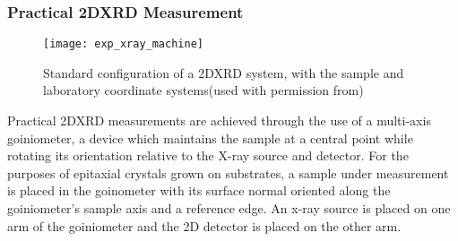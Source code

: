 \subsubsection{Practical 2DXRD Measurement}
\begin{figure}
    \centering
    \texttt{[image: exp\_xray\_machine]}
    \caption[Typical 2DXRD experimental implementation]{\label{fig:exp_xray_machine}Standard configuration of a 2DXRD system, with the sample and laboratory coordinate systems(used with permission from\cite{He2009})}
\end{figure}
Practical 2DXRD measurements are achieved through the use of a multi-axis goiniometer, a device which maintains the sample at a central point while rotating its orientation relative to the X-ray source and detector. For the purposes of epitaxial crystals grown on substrates, a sample under measurement is placed in the goinometer with its surface normal oriented along the goiniometer's sample axis and a reference edge. An x-ray source is placed on one arm of the goiniometer and the 2D detector is placed on the other arm.

